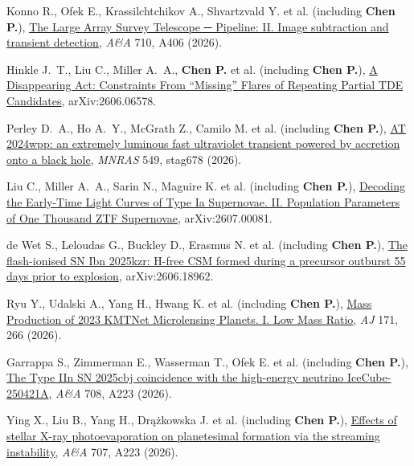 
\item Konno R., Ofek E., Krassilchtchikov A., Shvartzvald Y. et al. (including \textbf{Chen P.}), \href{https://ui.adsabs.harvard.edu/abs/2026A&A...710A.406K}{The Large Array Survey Telescope ─ Pipeline: II. Image subtraction and transient detection}, \textit{A\&A} 710, A406 (2026).

\item Hinkle J.~T., Liu C., Miller A.~A., \textbf{Chen P.} et al. (including \textbf{Chen P.}), \href{https://ui.adsabs.harvard.edu/abs/2026arXiv260606578H}{A Disappearing Act: Constraints From ``Missing'' Flares of Repeating Partial TDE Candidates}, arXiv:2606.06578.

\item Perley D.~A., Ho A.~Y., McGrath Z., Camilo M. et al. (including \textbf{Chen P.}), \href{https://ui.adsabs.harvard.edu/abs/2026MNRAS.549ag678P}{AT 2024wpp: an extremely luminous fast ultraviolet transient powered by accretion onto a black hole}, \textit{MNRAS} 549, stag678 (2026).

\item Liu C., Miller A.~A., Sarin N., Maguire K. et al. (including \textbf{Chen P.}), \href{https://ui.adsabs.harvard.edu/abs/2026arXiv260700081L}{Decoding the Early-Time Light Curves of Type Ia Supernovae. II. Population Parameters of One Thousand ZTF Supernovae}, arXiv:2607.00081.

\item de Wet S., Leloudas G., Buckley D., Erasmus N. et al. (including \textbf{Chen P.}), \href{https://ui.adsabs.harvard.edu/abs/2026arXiv260618962D}{The flash-ionised SN Ibn 2025kzr: H-free CSM formed during a precursor outburst 55 days prior to explosion}, arXiv:2606.18962.

\item Ryu Y., Udalski A., Yang H., Hwang K. et al. (including \textbf{Chen P.}), \href{https://ui.adsabs.harvard.edu/abs/2026AJ....171..266R}{Mass Production of 2023 KMTNet Microlensing Planets. I. Low Mass Ratio}, \textit{AJ} 171, 266 (2026).

\item Garrappa S., Zimmerman E., Wasserman T., Ofek E. et al. (including \textbf{Chen P.}), \href{https://ui.adsabs.harvard.edu/abs/2026A&A...708A.223G}{The Type IIn SN 2025cbj coincidence with the high-energy neutrino IceCube-250421A}, \textit{A\&A} 708, A223 (2026).

\item Ying X., Liu B., Yang H., Dr{\k{a}}{\.z}kowska J. et al. (including \textbf{Chen P.}), \href{https://ui.adsabs.harvard.edu/abs/2026A&A...707A.223Y}{Effects of stellar X-ray photoevaporation on planetesimal formation via the streaming instability}, \textit{A\&A} 707, A223 (2026).

